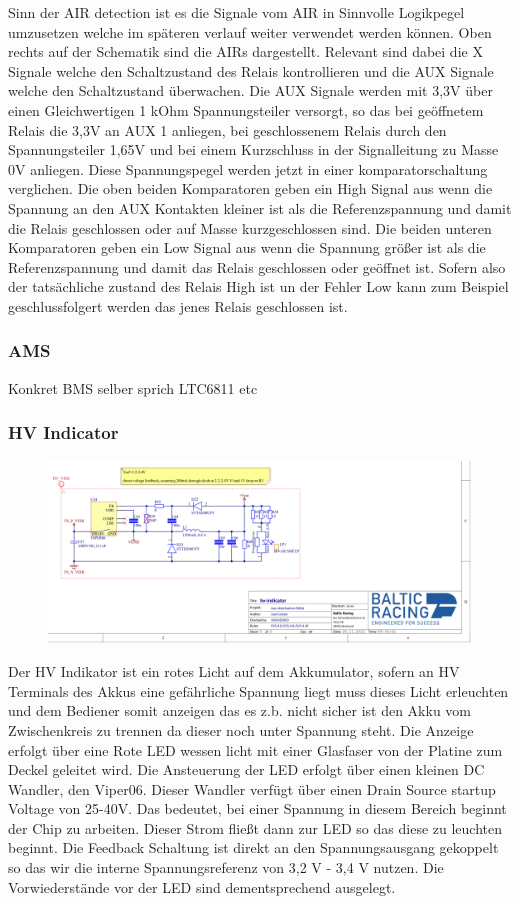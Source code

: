 Sinn der AIR detection ist es die Signale vom AIR in Sinnvolle Logikpegel umzusetzen welche im späteren verlauf weiter verwendet werden können. Oben rechts auf der Schematik sind die AIRs dargestellt. Relevant sind dabei die X Signale welche den Schaltzustand des Relais kontrollieren und die AUX Signale welche den Schaltzustand überwachen. Die AUX Signale werden mit 3,3V über einen Gleichwertigen 1 kOhm Spannungsteiler versorgt, so das bei geöffnetem Relais die 3,3V an AUX 1 anliegen, bei geschlossenem Relais durch den Spannungsteiler 1,65V und bei einem Kurzschluss in der Signalleitung zu Masse 0V anliegen. Diese Spannungspegel werden jetzt in einer komparatorschaltung verglichen. Die oben beiden Komparatoren geben ein High Signal aus wenn die Spannung an den AUX Kontakten kleiner ist als die Referenzspannung und damit die Relais geschlossen oder auf Masse kurzgeschlossen sind. Die beiden unteren Komparatoren geben ein Low Signal aus wenn die Spannung größer ist als die Referenzspannung und damit das Relais geschlossen oder geöffnet ist. Sofern also der tatsächliche zustand des Relais High ist un der Fehler Low kann zum Beispiel geschlussfolgert werden das jenes Relais geschlossen ist.

\subsubsection{AMS}
Konkret BMS selber sprich LTC6811 etc

\subsubsection{HV Indicator}

\begin{figure}
	\centering
	\includegraphics[width=0.7\linewidth]{bilder/HV_indicator_schematic}
	\caption{}
	\label{fig:hvindicatorschematic}
\end{figure}

Der HV Indikator ist ein rotes Licht auf dem Akkumulator, sofern an HV Terminals des Akkus eine gefährliche Spannung liegt muss dieses Licht erleuchten und dem Bediener somit anzeigen das es z.b. nicht sicher ist den Akku vom Zwischenkreis zu trennen da dieser noch unter Spannung steht. Die Anzeige erfolgt über eine Rote LED wessen licht mit einer Glasfaser von der Platine zum Deckel geleitet wird. Die Ansteuerung der LED erfolgt über einen kleinen DC Wandler, den Viper06. Dieser Wandler verfügt über einen Drain Source startup Voltage von 25-40V. Das bedeutet, bei einer Spannung in diesem Bereich beginnt der Chip zu arbeiten. Dieser Strom fließt dann zur LED so das diese zu leuchten beginnt. Die Feedback Schaltung ist direkt an den Spannungsausgang gekoppelt so das wir die interne Spannungsreferenz von 3,2 V - 3,4 V nutzen. Die Vorwiederstände vor der LED sind dementsprechend ausgelegt.

